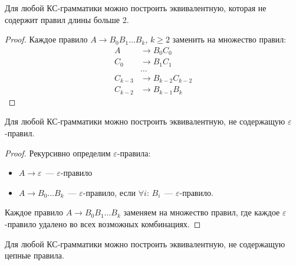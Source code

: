 \begin{lemma}
    Для любой КС-грамматики можно построить эквивалентную, которая не содержит правил длины больше 2.
\end{lemma}

\begin{proof}
    Каждое правило $A \to B_0 B_1 \dots B_k$, $k \geq 2$ заменить на множество правил:
    \begin{align*}
        A       & \to B_0 C_0         \\
        C_0     & \to B_1 C_1         \\
                & \dots               \\
        C_{k-3} & \to B_{k-2} C_{k-2} \\
        C_{k-2} & \to B_{k-1} B_k
    \end{align*}
\end{proof}


\begin{lemma}
    Для любой КС-грамматики можно построить эквивалентную, не содержащую $\varepsilon$-правил.
\end{lemma}

\begin{proof}
    Рекурсивно определим $\varepsilon$-правила:
    \begin{itemize}
        \item $A \to \varepsilon$~--- $\varepsilon$-правило
        \item $A \to B_0 \dots B_k$~--- $\varepsilon$-правило, если $\forall i$: $B_i$~--- $\varepsilon$-правило.
    \end{itemize}
    Каждое правило $A \to B_0 B_1 \dots B_k$ заменяем на множество правил, где каждое $\varepsilon$-правило удалено во всех возможных комбинациях.
\end{proof}

\begin{lemma}
    Для любой КС-грамматики можно построить эквивалентную, не содержащую цепные правила.
\end{lemma}

